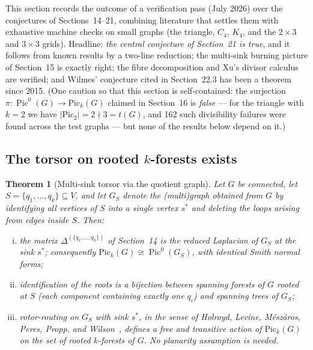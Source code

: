 \documentclass[11pt]{article}
\newcommand{\Pic}{\operatorname{Pic}^0}
\newtheorem{theorem}{Theorem}
\begin{document}
This section records the outcome of a verification pass (July 2026) over the
conjectures of Sections~14--21, combining literature that settles them with
exhaustive machine checks on small graphs (the triangle, $C_4$, $K_4$, and the
$2 \times 3$ and $3 \times 3$ grids). Headline: \emph{the central conjecture of
Section~21 is true}, and it follows from known results by a two-line reduction;
the multi-sink burning picture of Section~15 is exactly right; the fibre
decomposition and Xu's divisor calculus are verified; and Wilmes' conjecture
cited in Section~22.3 has been a theorem since 2015. (One caution so that this
section is self-contained: the surjection $\pi : \Pic(G) \to \mathrm{Pic}_k(G)$
claimed in Section~16 is \emph{false} --- for the triangle with $k = 2$ we have
$|\mathrm{Pic}_2| = 2 \nmid 3 = t(G)$, and 162 such divisibility failures were
found across the test graphs --- but none of the results below depend on it.)

\subsection{The torsor on rooted $k$-forests exists}

\begin{theorem}[Multi-sink torsor via the quotient graph]
\label{thm:multisink-torsor}
Let $G$ be connected, let $S = \{q_1, \ldots, q_k\} \subseteq V$, and let
$G_S$ denote the (multi)graph obtained from $G$ by identifying all vertices of
$S$ into a single vertex $s^*$ and deleting the loops arising from edges inside
$S$. Then:
\begin{enumerate}[(i)]
  \item the matrix $\Delta^{(\{q_1,\ldots,q_k\})}$ of Section~14 \emph{is} the
    reduced Laplacian of $G_S$ at the sink $s^*$; consequently
    $\mathrm{Pic}_k(G) \cong \Pic(G_S)$, with identical Smith normal forms;
  \item identification of the roots is a bijection between spanning forests of
    $G$ rooted at $S$ (each component containing exactly one $q_i$) and
    spanning trees of $G_S$;
  \item rotor-routing on $G_S$ with sink $s^*$, in the sense of Holroyd,
    Levine, M\'esz\'aros, Peres, Propp, and Wilson~\cite{holroyd2008chip},
    defines a \emph{free and transitive} action of $\mathrm{Pic}_k(G)$ on the
    set of rooted $k$-forests of $G$. No planarity assumption is needed.
\end{enumerate}
\end{theorem}
\end{document}
